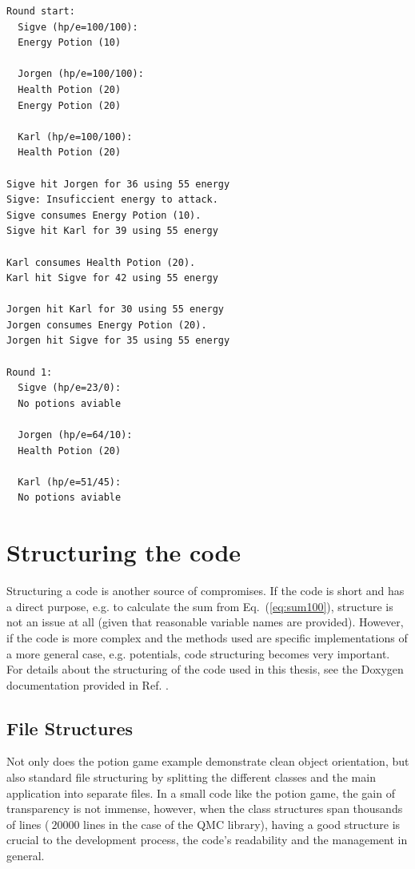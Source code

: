 \scriptsize
\begin{verbatim}
Round start: 
  Sigve (hp/e=100/100):
  Energy Potion (10)

  Jorgen (hp/e=100/100):
  Health Potion (20)
  Energy Potion (20)

  Karl (hp/e=100/100):
  Health Potion (20)

Sigve hit Jorgen for 36 using 55 energy
Sigve: Insuficcient energy to attack.
Sigve consumes Energy Potion (10).
Sigve hit Karl for 39 using 55 energy

Karl consumes Health Potion (20).
Karl hit Sigve for 42 using 55 energy

Jorgen hit Karl for 30 using 55 energy
Jorgen consumes Energy Potion (20).
Jorgen hit Sigve for 35 using 55 energy

Round 1: 
  Sigve (hp/e=23/0):
  No potions aviable

  Jorgen (hp/e=64/10):
  Health Potion (20)

  Karl (hp/e=51/45):
  No potions aviable
\end{verbatim}
\clearpage
\normalsize

\section{Structuring the code}

Structuring a code is another source of compromises. If the code is short and has a direct purpose, e.g. to calculate the sum from Eq.~(\ref{eq:sum100}), structure is not an issue at all (given that reasonable variable names are provided). However, if the code is more complex and the methods used are specific implementations of a more general case, e.g. potentials, code structuring becomes very important. For details about the structuring of the code used in this thesis, see the Doxygen documentation provided in Ref. \cite{libBorealisCode}. 

\subsection{File Structures}

Not only does the potion game example demonstrate clean object orientation, but also standard file structuring by splitting the different classes and the main application into separate files. In a small code like the potion game, the gain of transparency is not immense, however, when the class structures span thousands of lines ($~ 20 000$ lines in the case of the QMC library), having a good structure is crucial to the development process, the code's readability and the management in general.

